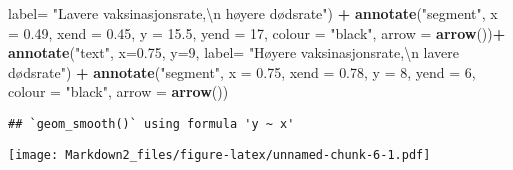\documentclass[
]{article}
\newenvironment{Shaded}{\begin{snugshade}}{\end{snugshade}}
\newcommand{\CharTok}[1]{\textcolor[rgb]{0.31,0.60,0.02}{#1}}
\newcommand{\DataTypeTok}[1]{\textcolor[rgb]{0.13,0.29,0.53}{#1}}
\newcommand{\DecValTok}[1]{\textcolor[rgb]{0.00,0.00,0.81}{#1}}
\newcommand{\FloatTok}[1]{\textcolor[rgb]{0.00,0.00,0.81}{#1}}
\newcommand{\KeywordTok}[1]{\textcolor[rgb]{0.13,0.29,0.53}{\textbf{#1}}}
\newcommand{\NormalTok}[1]{#1}
\newcommand{\OperatorTok}[1]{\textcolor[rgb]{0.81,0.36,0.00}{\textbf{#1}}}
\newcommand{\StringTok}[1]{\textcolor[rgb]{0.31,0.60,0.02}{#1}}
\begin{document}
\begin{Shaded}
\begin{Highlighting}[]
           \DataTypeTok{label=} \StringTok{"Lavere vaksinasjonsrate,}\CharTok{\textbackslash{}n}\StringTok{ høyere dødsrate"}\NormalTok{) }\OperatorTok{+}
\StringTok{  }\KeywordTok{annotate}\NormalTok{(}\StringTok{"segment"}\NormalTok{, }\DataTypeTok{x =} \FloatTok{0.49}\NormalTok{, }
           \DataTypeTok{xend =} \FloatTok{0.45}\NormalTok{, }\DataTypeTok{y =} \FloatTok{15.5}\NormalTok{, }
           \DataTypeTok{yend =} \DecValTok{17}\NormalTok{, }\DataTypeTok{colour =} \StringTok{"black"}\NormalTok{, }\DataTypeTok{arrow =} \KeywordTok{arrow}\NormalTok{())}\OperatorTok{+}
\StringTok{  }\KeywordTok{annotate}\NormalTok{(}\StringTok{"text"}\NormalTok{, }\DataTypeTok{x=}\FloatTok{0.75}\NormalTok{, }\DataTypeTok{y=}\DecValTok{9}\NormalTok{, }
           \DataTypeTok{label=} \StringTok{"Høyere vaksinasjonsrate,}\CharTok{\textbackslash{}n}\StringTok{ lavere dødsrate"}\NormalTok{) }\OperatorTok{+}
\StringTok{  }\KeywordTok{annotate}\NormalTok{(}\StringTok{"segment"}\NormalTok{, }\DataTypeTok{x =} \FloatTok{0.75}\NormalTok{, }
           \DataTypeTok{xend =} \FloatTok{0.78}\NormalTok{, }\DataTypeTok{y =} \DecValTok{8}\NormalTok{, }
           \DataTypeTok{yend =} \DecValTok{6}\NormalTok{, }\DataTypeTok{colour =} \StringTok{"black"}\NormalTok{, }\DataTypeTok{arrow =} \KeywordTok{arrow}\NormalTok{())}
\end{Highlighting}
\end{Shaded}

\begin{verbatim}
## `geom_smooth()` using formula 'y ~ x'
\end{verbatim}

\texttt{[image: Markdown2\_files/figure-latex/unnamed-chunk-6-1.pdf]}
\end{document}
